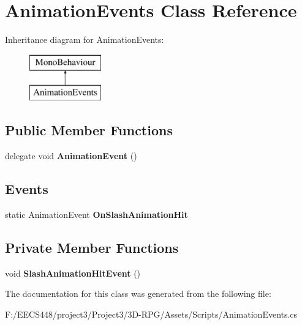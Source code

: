 \hypertarget{class_animation_events}{}\section{Animation\+Events Class Reference}
\label{class_animation_events}
Inheritance diagram for Animation\+Events\+:\begin{figure}[H]
\begin{center}
\leavevmode
\includegraphics[height=2.000000cm]{class_animation_events}
\end{center}
\end{figure}
\subsection*{Public Member Functions}
\begin{DoxyCompactItemize}
\item 
\mbox{\label{class_animation_events_a84e50a374d6adcd7ee1e6c938e298017}} 
delegate void {\bfseries Animation\+Event} ()
\end{DoxyCompactItemize}
\subsection*{Events}
\begin{DoxyCompactItemize}
\item 
\mbox{\label{class_animation_events_aaf85cff720e85b6ede2292b34991d17e}} 
static Animation\+Event {\bfseries On\+Slash\+Animation\+Hit}
\end{DoxyCompactItemize}
\subsection*{Private Member Functions}
\begin{DoxyCompactItemize}
\item 
\mbox{\label{class_animation_events_a95482e2327c48cadc330b9ef2a69388d}} 
void {\bfseries Slash\+Animation\+Hit\+Event} ()
\end{DoxyCompactItemize}


The documentation for this class was generated from the following file\+:\begin{DoxyCompactItemize}
\item 
F\+:/\+E\+E\+C\+S448/project3/\+Project3/3\+D-\/\+R\+P\+G/\+Assets/\+Scripts/Animation\+Events.\+cs\end{DoxyCompactItemize}
